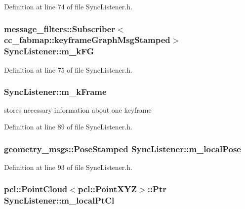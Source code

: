 \-Definition at line 74 of file \-Sync\-Listener.\-h.

\hypertarget{classSyncListener_a80a7b642798ea3441475ab9c57567345}{
\subsubsection[{m\-\_\-k\-F\-G}]{\setlength{\rightskip}{0pt plus 5cm}message\-\_\-filters\-::\-Subscriber$<$cc\-\_\-fabmap\-::keyframe\-Graph\-Msg\-Stamped$>$ {\bf \-Sync\-Listener\-::m\-\_\-k\-F\-G}}}\label{classSyncListener_a80a7b642798ea3441475ab9c57567345}


\-Definition at line 75 of file \-Sync\-Listener.\-h.

\hypertarget{classSyncListener_a4d09eece5d98418ba9f0d5e2b78739db}{
\subsubsection[{m\-\_\-k\-Frame}]{ {\bf \-Sync\-Listener\-::m\-\_\-k\-Frame}}}\label{classSyncListener_a4d09eece5d98418ba9f0d5e2b78739db}


stores necessary information about one keyframe 



\-Definition at line 89 of file \-Sync\-Listener.\-h.

\hypertarget{classSyncListener_a17fb054f6825f7b44eeab7467938ac81}{
\subsubsection[{m\-\_\-local\-Pose}]{\setlength{\rightskip}{0pt plus 5cm}geometry\-\_\-msgs\-::\-Pose\-Stamped {\bf \-Sync\-Listener\-::m\-\_\-local\-Pose}}}\label{classSyncListener_a17fb054f6825f7b44eeab7467938ac81}


\-Definition at line 93 of file \-Sync\-Listener.\-h.

\hypertarget{classSyncListener_adf1510f0bffe657a07972b53265462a7}{
\subsubsection[{m\-\_\-local\-Pt\-Cl}]{\setlength{\rightskip}{0pt plus 5cm}pcl\-::\-Point\-Cloud$<$pcl\-::\-Point\-X\-Y\-Z$>$\-::\-Ptr {\bf \-Sync\-Listener\-::m\-\_\-local\-Pt\-Cl}}}\label{classSyncListener_adf1510f0bffe657a07972b53265462a7}


